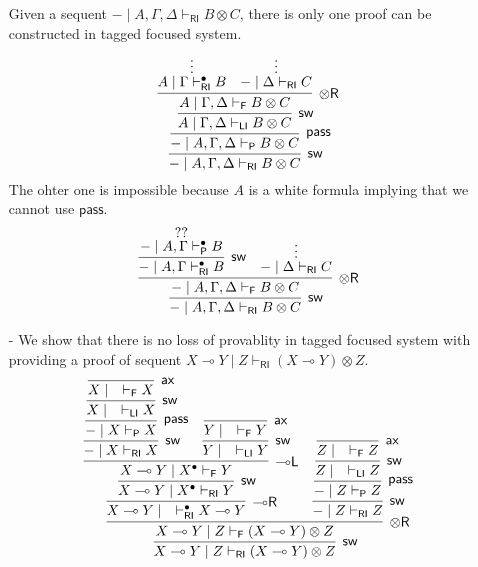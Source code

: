 \documentclass[submission,copyright,creativecommons]{eptcs}
\theoremstyle{definition}
\newcommand{\tr}{\otimes \mathsf{R}}
\newcommand{\lright}{{\multimap}\mathsf{R}}
\newcommand{\lleft}{{\multimap}\mathsf{L}}
\newcommand{\pass}{\mathsf{pass}}
\newcommand{\ax}{\mathsf{ax}}
\newcommand{\ot}{\otimes}
\newcommand{\lolli}{\multimap}
\newcommand{\RI}{\mathsf{RI}}
\newcommand{\LI}{\mathsf{LI}}
\newcommand{\Pass}{\mathsf{P}}
\newcommand{\F}{\mathsf{F}}
\begin{document}
\begin{itemize}
  Given a sequent $- \mid A , \Gamma , \Delta \vdash_{\RI} B \ot C$, there is only one proof can be constructed in tagged focused system.
  \begin{displaymath}
    \infer[\mathsf{sw}]{- \mid A , \Gamma , \Delta \vdash_{\RI} B \ot C}{
      \infer[\pass]{- \mid A , \Gamma , \Delta \vdash_{\Pass} B \ot C}{
        \infer[\mathsf{sw}]{A \mid \Gamma , \Delta \vdash_{\LI} B \ot C}{
          \infer[\tr]{A \mid \Gamma , \Delta \vdash_{\F} B \ot C}{
            \deduce{A \mid \Gamma \vdash^{\bullet}_{\RI} B}{\vdots}
            &
            \deduce{- \mid \Delta \vdash_{\RI} C}{\vdots}
          }
        }
      }
    }
  \end{displaymath}
  The ohter one is impossible because $A$ is a white formula implying that we cannot use $\pass$.
  \begin{displaymath}
    \infer[\mathsf{sw}]{- \mid A , \Gamma , \Delta \vdash_{\RI} B \ot C}{
      \infer[\tr]{- \mid A , \Gamma , \Delta \vdash_{\F} B \ot C}{
        \infer[\mathsf{sw}]{- \mid A , \Gamma \vdash^{\bullet}_{\RI} B}{
          \deduce{- \mid A , \Gamma \vdash^{\bullet}_{\Pass} B}{??}
        }
        &
        \deduce{- \mid \Delta \vdash_{\RI} C}{\vdots}
      }
    }
  \end{displaymath}
  \item[-] We show that there is no loss of provablity in tagged focused system with providing a proof of sequent $X \lolli Y \mid Z \vdash_{\RI} (X \lolli Y) \ot Z$.
  \begin{displaymath}
    \infer[\mathsf{sw}]{X \lolli Y \mid Z \vdash_{\RI} (X \lolli Y) \ot Z}{
      \infer[\tr]{X \lolli Y \mid Z \vdash_{\F} (X \lolli Y) \ot Z}{
        \infer[\lright]{X \lolli Y \mid \quad \vdash^{\bullet}_{\RI} X \lolli Y}{
          \infer[\mathsf{sw}]{X \lolli Y \mid X^{\bullet} \vdash_{\RI} Y}{
            \infer[\lleft]{X \lolli Y \mid X^{\bullet} \vdash_{\F} Y}{
              \infer[\mathsf{sw}]{- \mid X \vdash_{\RI} X}{
                \infer[\pass]{- \mid X \vdash_{\Pass} X}{
                  \infer[\mathsf{sw}]{X \mid \quad \vdash_{\LI} X}{
                    \infer[\ax]{X \mid \quad \vdash_{\F} X}{}
                  }
                }
              }
              &
              \infer[\mathsf{sw}]{Y \mid \quad \vdash_{\LI} Y}{
                \infer[\ax]{Y \mid \quad \vdash_{\F} Y}{}
              }
            }
          }
        }
        &
        \infer[\mathsf{sw}]{- \mid Z \vdash_{\RI} Z}{
          \infer[\pass]{- \mid Z \vdash_{\Pass} Z}{
            \infer[\mathsf{sw}]{Z \mid \quad \vdash_{\LI} Z}{
              \infer[\ax]{Z \mid \quad \vdash_{\F} Z}{}
            }
          }
        }
      }
    }
  \end{displaymath}
\end{itemize}
\end{document}
